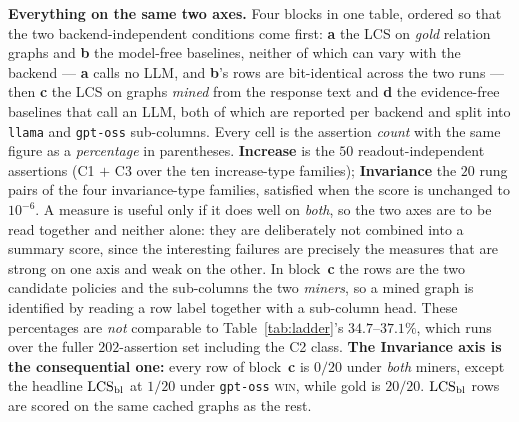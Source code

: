 \begin{table}[tbp]
\centering\small
\caption{\textbf{Everything on the same two axes.} Four blocks in one table, ordered so that the two
  backend-independent conditions come first: \textbf{a} the LCS on \emph{gold} relation graphs and \textbf{b}
  the model-free baselines, neither of which can vary with the backend --- \textbf{a} calls no LLM, and
  \textbf{b}'s rows are bit-identical across the two runs --- then \textbf{c} the LCS on graphs \emph{mined}
  from the response text and \textbf{d} the evidence-free baselines that call an LLM, both of which are
  reported per backend and split into \texttt{llama} and \texttt{gpt-oss} sub-columns. Every cell is the
  assertion \emph{count} with the same figure as a \emph{percentage} in parentheses. \textbf{Increase} is the
  $50$ readout-independent assertions (C1 $+$ C3 over the ten increase-type families); \textbf{Invariance}
  the $20$ rung pairs of the four invariance-type families, satisfied when the score is unchanged to
  $10^{-6}$. A measure is useful only if it does well on \emph{both}, so the two axes are to be read together
  and neither alone: they are deliberately not combined into a summary score, since the interesting failures
  are precisely the measures that are strong on one axis and weak on the other. In block~\textbf{c} the rows
  are the two candidate policies and the sub-columns the two \emph{miners}, so a mined graph is identified by
  reading a row label together with a sub-column head. These percentages are \emph{not} comparable to
  Table~\ref{tab:ladder}'s $34.7$--$37.1\%$, which runs over the fuller $202$-assertion set including the C2
  class. \textbf{The Invariance axis is the consequential one:} every row of block~\textbf{c} is $0/20$
  under \emph{both} miners, except the headline $\LCS_{\bal}$ at $1/20$ under \texttt{gpt-oss}
  \textsc{win}, while gold is $20/20$. $\LCS_{\bal}$ rows are scored on the same cached graphs as the rest.}
\label{tab:summary-mined}

\end{table}
